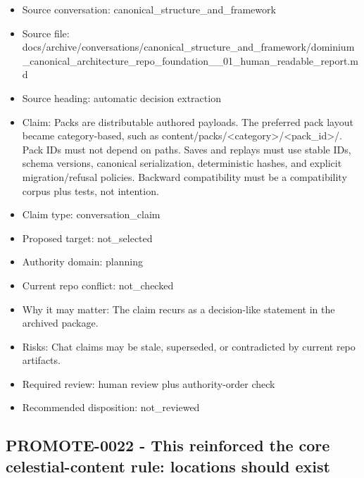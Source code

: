 \documentclass[11pt,a4paper]{report}
\begin{document}
\begin{itemize}
\item Source conversation: canonical\_structure\_and\_framework
\item Source file: docs/archive/conversations/canonical\_structure\_and\_framework/dominium\_canonical\_architecture\_repo\_foundation\_\_01\_human\_readable\_report.md
\item Source heading: automatic decision extraction
\item Claim: Packs are distributable authored payloads. The preferred pack layout became category-based, such as content/packs/<category>/<pack\_id>/. Pack IDs must not depend on paths. Saves and replays must use stable IDs, schema versions, canonical serialization, deterministic hashes, and explicit migration/refusal policies. Backward compatibility must be a compatibility corpus plus tests, not intention.
\item Claim type: conversation\_claim
\item Proposed target: not\_selected
\item Authority domain: planning
\item Current repo conflict: not\_checked
\item Why it may matter: The claim recurs as a decision-like statement in the archived package.
\item Risks: Chat claims may be stale, superseded, or contradicted by current repo artifacts.
\item Required review: human review plus authority-order check
\item Recommended disposition: not\_reviewed
\end{itemize}

\subsection{PROMOTE-0022 - This reinforced the core celestial-content rule: locations should exist}
\end{document}
